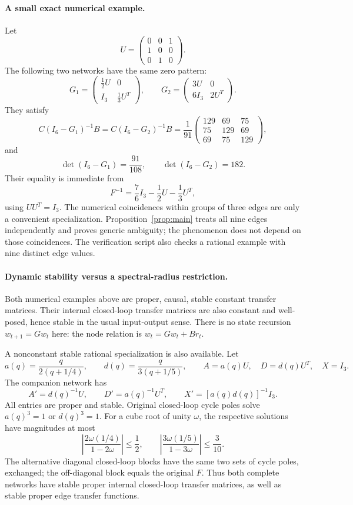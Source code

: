 \documentclass[11pt,a4paper]{article}
\begin{document}
\paragraph{A small exact numerical example.}
Let
\[
 U=\begin{pmatrix}0&0&1\\1&0&0\\0&1&0\end{pmatrix}.
\]
The following two networks have the same zero pattern:
\[
 G_1=\begin{pmatrix}\frac12U&0\\I_3&\frac13U^T\end{pmatrix},\qquad
 G_2=\begin{pmatrix}3U&0\\6I_3&2U^T\end{pmatrix}.
\]
They satisfy
\[
 C(I_6-G_1)^{-1}B=C(I_6-G_2)^{-1}B
 =\frac1{91}\begin{pmatrix}129&69&75\\75&129&69\\69&75&129\end{pmatrix},
\]
and
\[
 \det(I_6-G_1)=\frac{91}{108},\qquad \det(I_6-G_2)=182.
\]
Their equality is immediate from
\[
 F^{-1}=\frac76I_3-\frac12U-\frac13U^T,
\]
using $UU^T=I_3$. The numerical coincidences within groups of three edges
are only a convenient specialization. Proposition~\ref{prop:main} treats
all nine edges independently and proves generic ambiguity; the phenomenon
does not depend on those coincidences. The verification script also checks
a rational example with nine distinct edge values.

\paragraph{Dynamic stability versus a spectral-radius restriction.}
Both numerical examples above are proper, causal, stable constant transfer
matrices. Their internal closed-loop transfer matrices are also constant
and well-posed, hence stable in the usual input-output sense. There is no
state recursion $w_{t+1}=Gw_t$ here: the node relation is $w_t=Gw_t+Br_t$.

A nonconstant stable rational specialization is also available. Let
\[
 a(q)=\frac{q}{2(q+1/4)},\qquad
 d(q)=\frac{q}{3(q+1/5)},\qquad
 A=a(q)U,\quad D=d(q)U^T,\quad X=I_3.
\]
The companion network has
\[
 A'=d(q)^{-1}U,\qquad D'=a(q)^{-1}U^T,\qquad
 X'=[a(q)d(q)]^{-1}I_3.
\]
All entries are proper and stable. Original closed-loop cycle poles solve
$a(q)^3=1$ or $d(q)^3=1$. For a cube root of unity $\omega$, the respective
solutions have magnitudes at most
\[
 \left|\frac{2\omega(1/4)}{1-2\omega}\right|\le\frac12,
 \qquad
 \left|\frac{3\omega(1/5)}{1-3\omega}\right|\le\frac3{10}.
\]
The alternative diagonal closed-loop blocks have the same two sets of
cycle poles, exchanged; the off-diagonal block equals the original $F$.
Thus both complete networks have stable proper internal closed-loop
transfer matrices, as well as stable proper edge transfer functions.
\end{document}
